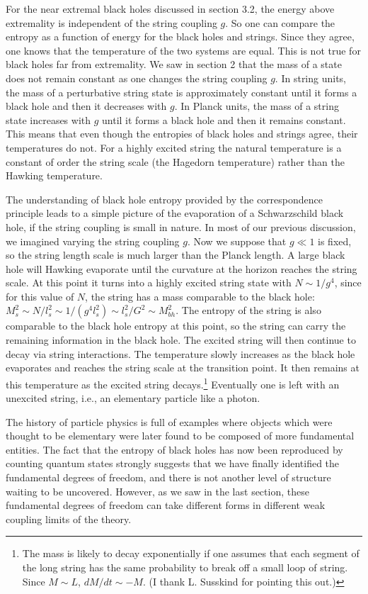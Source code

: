 For the near extremal black holes discussed in section 3.2, the energy
above extremality is independent of the string coupling $g$. 
So one
can compare the entropy as a function of energy for the black holes and
strings. Since they agree, one knows that the temperature of the two
systems are equal. This is not true for black holes far from extremality.
We saw in section 2 that the mass of a state does not remain
constant as one changes the string coupling $g$. In string units, the
mass of a perturbative string state is approximately constant until it
forms a black hole and then it decreases with $g$. In
Planck units, the mass of a string state increases with $g$ until it
forms a black hole and then it remains constant. This means that even
though the entropies of black holes and strings agree, their temperatures
do not. For a highly excited string the natural temperature is a
constant of order the string scale  (the Hagedorn temperature) rather than
the Hawking temperature.  


The understanding of black hole entropy provided by the correspondence
principle leads to a simple picture of the evaporation of a Schwarzschild
black hole, if the string coupling is small in nature. 
In most of our previous discussion, we imagined varying the
string coupling $g$. Now we suppose that $g \ll 1$ is fixed,
so the
string length scale is much larger than the Planck length.
A large black hole will Hawking evaporate until the curvature at the
horizon
reaches the string scale. At this point it turns into a highly
excited string state with $N \sim 1/g^4$, since for this value of $N$,
the string has a mass  comparable to the black hole: $M_s^2 \sim N/l_s^2 \sim
1/(g^4 l_s^2) \sim l_s^2/G^2 \sim M_{bh}^2$.  The entropy of the string is also
comparable to the black hole entropy at this point, so the string can
carry the remaining information in the black hole.
The excited string will then continue
to decay via string interactions. The temperature slowly increases as the black 
hole evaporates and reaches the string scale at the transition point. It then
remains at this temperature as the excited string decays.\footnote{The mass
is likely to decay exponentially if one assumes that each segment of the long
string has the same probability to break off a small loop of string. Since
$M\sim L$, $dM/dt \sim -M$. (I thank L. Susskind for pointing this out.)} 
Eventually
one is left with an unexcited string, i.e., an elementary particle
like a photon.

The history of particle physics is full of examples where objects which were
thought to be elementary were later found to be composed of more
fundamental entities.
The fact that the entropy of black holes has now been reproduced by
counting quantum states strongly suggests that we have finally identified
the fundamental degrees of freedom, and there is not another level
of structure waiting to be uncovered. However, as we saw in the  last
section, these fundamental degrees of freedom can take different forms in 
different weak coupling limits of the theory.

